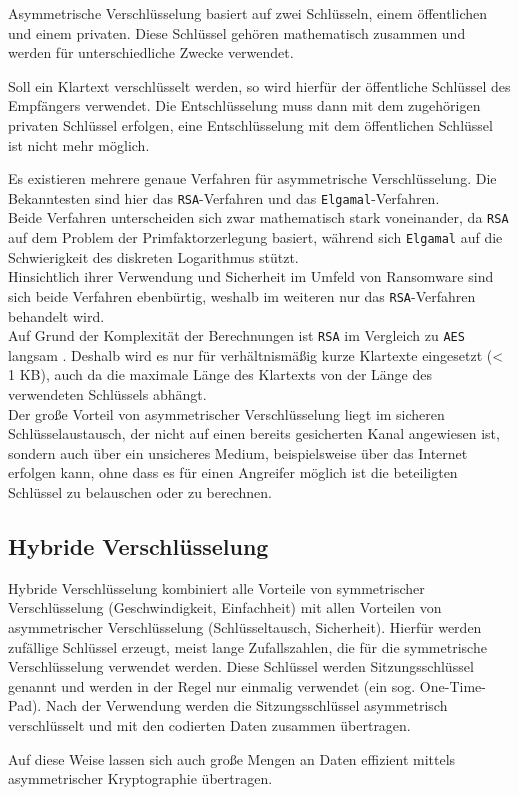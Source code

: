 Asymmetrische Verschlüsselung basiert auf zwei Schlüsseln, einem öffentlichen und einem privaten. Diese Schlüssel gehören mathematisch zusammen und werden für unterschiedliche Zwecke verwendet.

Soll ein Klartext verschlüsselt werden, so wird hierfür der öffentliche Schlüssel des Empfängers verwendet. Die Entschlüsselung muss dann mit dem zugehörigen privaten Schlüssel erfolgen, eine Entschlüsselung mit dem öffentlichen Schlüssel ist nicht mehr möglich.

Es existieren mehrere genaue Verfahren für asymmetrische Verschlüsselung. Die Bekanntesten sind hier das \texttt{RSA}-Verfahren und das \texttt{Elgamal}-Verfahren.\\
Beide Verfahren unterscheiden sich zwar mathematisch stark voneinander, da \texttt{RSA} auf dem Problem der Primfaktorzerlegung basiert, während sich \texttt{Elgamal} auf die Schwierigkeit des diskreten Logarithmus stützt. \\
Hinsichtlich ihrer Verwendung und Sicherheit im Umfeld von Ransomware sind sich beide Verfahren ebenbürtig, weshalb im weiteren nur das \texttt{RSA}-Verfahren behandelt wird.
\\

Auf Grund der Komplexität der Berechnungen ist \texttt{RSA} im Vergleich zu \texttt{AES} langsam \cite{crypto:aes_rsa_benchmark}. Deshalb wird es nur für verhältnismäßig kurze Klartexte eingesetzt (< 1 KB), auch da die maximale Länge des Klartexts von der Länge des verwendeten Schlüssels abhängt. %
\\

Der große Vorteil von asymmetrischer Verschlüsselung liegt im sicheren Schlüsselaustausch, der nicht auf einen bereits gesicherten Kanal angewiesen ist, sondern auch über ein unsicheres Medium, beispielsweise über das Internet erfolgen kann, ohne dass es für einen Angreifer möglich ist die beteiligten Schlüssel zu belauschen oder zu berechnen. %




\subsection{Hybride Verschlüsselung}
\label{sec:hybride_verschl}

Hybride Verschlüsselung kombiniert alle Vorteile von symmetrischer Verschlüsselung (Geschwindigkeit, Einfachheit) mit allen Vorteilen von asymmetrischer Verschlüsselung (Schlüsseltausch, Sicherheit).
Hierfür werden zufällige Schlüssel erzeugt, meist lange Zufallszahlen, die für die symmetrische Verschlüsselung verwendet werden. Diese Schlüssel werden Sitzungsschlüssel genannt und werden in der Regel nur einmalig verwendet (ein sog. One-Time-Pad). Nach der Verwendung werden die Sitzungsschlüssel asymmetrisch verschlüsselt und mit den codierten Daten zusammen übertragen.

Auf diese Weise lassen sich auch große Mengen an Daten effizient mittels asymmetrischer Kryptographie übertragen.
